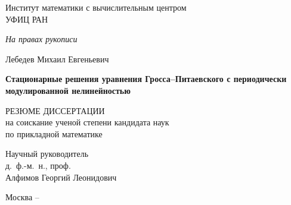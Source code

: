 \documentclass[candidate, href, colorlinks]{disser}
\begin{document}
\begin{titlepage}
\thispagestyle{empty}
\enlargethispage{1cm}
\vspace*{-2cm}

\begin{center}
	Институт математики с вычислительным центром \\ УФИЦ РАН
\end{center}

\vskip1cm
	
\begin{flushright}
	\emph{На правах рукописи}
\end{flushright}
	
\vskip3cm

\begin{center}
	{\large Лебедев Михаил Евгеньевич}
	\vskip1cm
	{\Large\bfseries Стационарные решения уравнения Гросса--Питаевского с периодически модулированной нелинейностью \par}
	\vskip1.5cm
	{РЕЗЮМЕ ДИССЕРТАЦИИ \\ на соискание ученой степени кандидата наук \\ по прикладной математике}
\end{center}

\vskip2cm

\hspace{8cm}\begin{minipage}{0.4\linewidth}
	Научный руководитель \\
	д.~ф.-м.~н., проф. \\
	Алфимов Георгий Леонидович
\end{minipage}

\vfill

\begin{center}
	{Москва -- \the\year}
\end{center}

\normalfont\clearpage
\end{titlepage}
\end{document}
